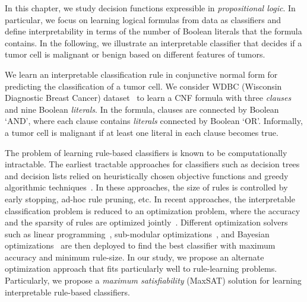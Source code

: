 In this chapter, we study decision functions expressible in \emph{propositional logic}. In particular, we focus on learning logical formulas from data as classifiers and define interpretability in terms of the number of Boolean literals that the formula contains. In the following, we illustrate an interpretable classifier that decides if a tumor cell is malignant or benign based on different features of tumors.

\vspace{1em}
\vspace{1em}


\begin{example}
	\normalfont
	We learn an interpretable classification rule in conjunctive normal form for predicting the classification of a tumor cell. We consider WDBC (Wisconsin Diagnostic Breast Cancer) dataset~\cite{agarap2018breast} to learn a CNF formula with three \emph{clauses} and nine Boolean \emph{literals}. In the formula, clauses are connected by Boolean `AND', where each clause contains \emph{literals} connected by Boolean `OR'. Informally, a tumor cell is malignant if at least one literal in each clause becomes true.
\end{example}



The problem of learning rule-based classifiers is known to be computationally intractable. The earliest tractable approaches for classifiers such as decision trees and decision lists relied on heuristically chosen objective functions and greedy algorithmic techniques~\cite{ClarkN1989,CohenS1999,quinlan2014}. In these approaches, the size of rules is controlled by early stopping,  ad-hoc rule pruning, etc. In recent approaches, the interpretable classification problem is reduced to an optimization problem, where the accuracy and the sparsity of rules are optimized jointly~\cite{lakkaraju2016interpretable,narodytska2018learning}. Different optimization solvers such as linear programming~\cite{malioutov2013exact}, sub-modular optimizations~\cite{lakkaraju2016interpretable}, and Bayesian optimizations~\cite{letham2015interpretable} are then deployed to find the best classifier with maximum accuracy and minimum rule-size. In our study, we propose an alternate optimization approach that fits particularly well to rule-learning problems. Particularly,  we propose a \textit{maximum satisfiability} (MaxSAT)  solution for learning interpretable rule-based classifiers. 

